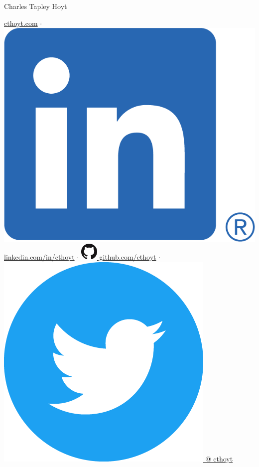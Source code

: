 \documentclass[11pt,a4paper,sans]{moderncv} %
\begin{document}
{\Huge Charles Tapley Hoyt}

\vspace{3mm}

\href{https://cthoyt.com}{cthoyt.com}
$\cdot$
\href{https://linkedin.com/in/cthoyt}{\includegraphics[scale=0.055]{img/LI-In-Bug} linkedin.com/in/cthoyt}
$\cdot$
\href{https://github.com/cthoyt}{\includegraphics[scale=0.25]{img/GitHub-Mark-32px} github.com/cthoyt}
$\cdot$
\href{https://twitter.com/cthoyt}{\includegraphics[scale=0.02]{img/Twitter_Social_Icon_Circle_Color} @ cthoyt}
\end{document}
